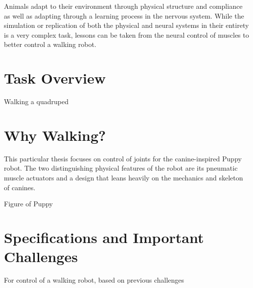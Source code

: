 Animals adapt to their environment through physical structure and compliance as
well as adapting through a learning process in the nervous system. While the
simulation or replication of both the physical and neural systems in their
entirety is a very complex task, lessons can be taken from the neural control of
muscles to better control a walking robot.

\section{Task Overview}

Walking a quadruped

\section{Why Walking?}

This particular thesis focuses on control of joints for the canine-inspired
Puppy robot. The two distinguishing physical features of the robot are its
pneumatic muscle actuators and a design that leans heavily on the mechanics and
skeleton of canines.

Figure of Puppy

\section{Specifications and Important Challenges}

For control of a walking robot, based on previous challenges

